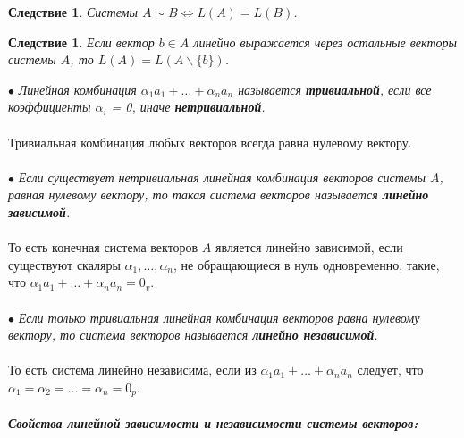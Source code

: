 \newtheorem*{Cor1*}{Следствие}\begin{Cor1*} Системы $A \sim B \Longleftrightarrow L(A) = L(B)$.
\end{Cor1*}
\newtheorem*{Cor2*}{Следствие}\begin{Cor2*}Если вектор $b\in A$ линейно выражается через остальные векторы системы $A$, то $L(A) = L(A\backslash \{b\})$.\end{Cor2*}
$\bullet$ \textit{Линейная комбинация $\alpha_1 a_1 + \ldots + \alpha_n a_n$  называется \textbf{тривиальной}, если все коэффициенты $\alpha_i$ = 0, иначе \textbf{нетривиальной}.}\\\\
Тривиальная комбинация любых векторов всегда равна нулевому вектору.\\\\
$\bullet$ \textit{Если существует нетривиальная линейная комбинация векторов системы $A$, равная нулевому вектору, то такая система векторов называется \textbf{линейно зависимой}.} \\\\То есть конечная система векторов $A$ является линейно зависимой, если существуют скаляры $\alpha_1,\dots,\alpha_n$, не обращающиеся в нуль одновременно, такие, что $\alpha_1a_1 + \ldots + \alpha_n a_n = 0_v$.\\\\
$\bullet$ \textit{Если только тривиальная линейная комбинация векторов равна нулевому вектору, то система векторов называется \textbf{линейно независимой}.}\\\\
То есть система линейно независима, если из $\alpha_1 a_1 + \ldots + \alpha_n a_n$ следует, что $\alpha_1 = \alpha_2 = \ldots = \alpha_n = 0_p$.\\\\
\textit{\textbf{Свойства линейной зависимости и независимости системы векторов:}}
